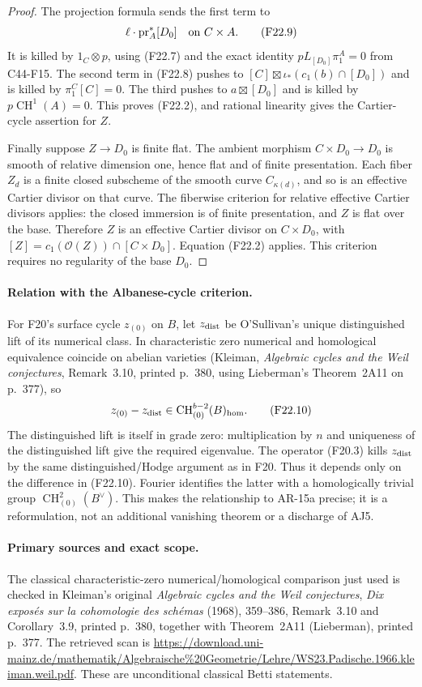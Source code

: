 \documentclass[11pt]{article}
\theoremstyle{remark}\newtheorem{remark}[theorem]{Remark}
\begin{document}
\begin{proof}
The projection formula sends the first term
to
\[
                             \ell\cdot\operatorname{pr}_A^*[D_0]
                 \quad\hbox{on }C\times A.
 \tag{F22.9}
\]
It is killed by $1_C\otimes p$, using (F22.7)
and the exact identity
$pL_{[D_0]}\pi_1^A=0$ from C44-F15.
The second term in (F22.8) pushes to
$[C]\boxtimes\iota_*(c_1(b)\cap[D_0])$
and is killed by $\pi_1^C[C]=0$.
The third pushes to $a\boxtimes[D_0]$
and is killed by $p\operatorname{CH}^1(A)=0$.
This proves (F22.2), and rational linearity
gives the Cartier-cycle assertion for $Z$.

Finally suppose $Z\to D_0$ is finite flat.
The ambient morphism $C\times D_0\to D_0$
is smooth of relative dimension one, hence
flat and of finite presentation.  Each fiber
$Z_d$ is a finite closed subscheme of the
smooth curve $C_{\kappa(d)}$, and so is an
effective Cartier divisor on that curve.
The fiberwise criterion for relative effective
Cartier divisors applies: the closed immersion
is of finite presentation, and $Z$ is flat
over the base.  Therefore $Z$ is an effective
Cartier divisor on $C\times D_0$, with
$[Z]=c_1(\mathcal O(Z))\cap[C\times D_0]$.
Equation (F22.2) applies.  This criterion
requires no regularity of the base $D_0$.
\end{proof}

\paragraph{Relation with the Albanese-cycle criterion.}
For F20's surface cycle $z_{(0)}$ on $B$, let
$z_{\rm dist}$ be O'Sullivan's unique distinguished
lift of its numerical class.  In characteristic
zero numerical and homological equivalence
coincide on abelian varieties (Kleiman,
\emph{Algebraic cycles and the Weil conjectures},
Remark~3.10, printed p.~380, using Lieberman's
Theorem~2A11 on p.~377), so
\[
                 z_{(0)}-z_{\rm dist}
                    \in\operatorname{CH}^{b-2}_{(0)}(B)_{\rm hom}.
 \tag{F22.10}
\]
The distinguished lift is itself in grade zero:
multiplication by $n$ and uniqueness of the
distinguished lift give the required eigenvalue.
The operator (F20.3) kills $z_{\rm dist}$ by
the same distinguished/Hodge argument as in
F20.  Thus it depends only on the difference
in (F22.10).  Fourier identifies the latter
with a homologically trivial group
$\operatorname{CH}^2_{(0)}(B^\vee)$.
This makes the relationship to AR-15a precise;
it is a reformulation, not an additional
vanishing theorem or a discharge of AJ5.

\paragraph{Primary sources and exact scope.}
The classical characteristic-zero numerical/homological
comparison just used is checked in Kleiman's original
\emph{Algebraic cycles and the Weil conjectures},
\emph{Dix expos\'es sur la cohomologie des sch\'emas}
(1968), 359--386, Remark~3.10 and Corollary~3.9,
printed p.~380, together with Theorem~2A11
(Lieberman), printed p.~377.  The retrieved scan is
\url{https://download.uni-mainz.de/mathematik/Algebraische%20Geometrie/Lehre/WS23.Padische.1966.kleiman.weil.pdf}.
These are unconditional classical Betti statements.
\end{document}
